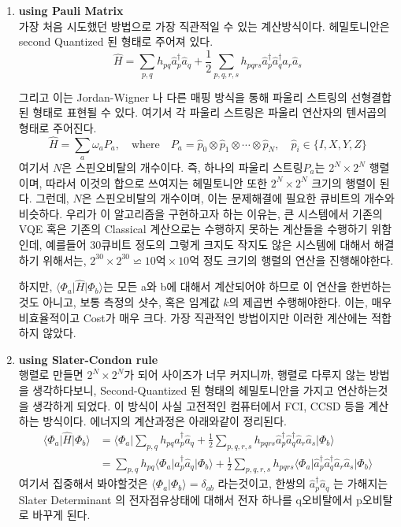 \documentclass[11pt]{article}
\begin{document}
\begin{enumerate}
  \item \textbf{using Pauli Matrix}\\ 
  가장 처음 시도했던 방법으로 가장 직관적일 수 있는 계산방식이다. 헤밀토니안은 second Quantized 된 형태로 주어져 있다. 
  \[
  \hat{H} = \sum_{p,q} h_{pq} \hat{a}_p^\dagger \hat{a}_q
  + \frac{1}{2} \sum_{p,q,r,s} h_{pqrs} \hat{a}_p^\dagger \hat{a}_q^\dagger \hat{a}_r \hat{a}_s
  \]

  그리고 이는 Jordan-Wigner 나 다른 매핑 방식을 통해 파울리 스트링의 선형결합된 형태로 표현될 수 있다. 
  여기서 각 파울리 스트링은 파울리 연산자의 텐서곱의 형태로 주어진다. 
  \[
  \hat{H} = \sum_{a} \omega_a P_a, \quad \text{where} \quad
  P_a = \hat{p}_0 \otimes \hat{p}_1 \otimes \cdots \otimes \hat{p}_N, \quad
  \hat{p}_i \in \{I, X, Y, Z\}
  \]
  여기서 \(N\)은 스핀오비탈의 개수이다. 즉, 하나의 파울리 스트링\(P_a\)는 \(2^N \times 2^N \) 행렬이며, 따라서 이것의 합으로 쓰여지는 헤밀토니안 또한 \(2^N \times 2^N \) 크기의 행렬이 된다.
  그런데, \(N\)은 스핀오비탈의 개수이며, 이는 문제해결에 필요한 큐비트의 개수와 비슷하다. 우리가 이 알고리즘을 구현하고자 하는 이유는, 큰 시스템에서 기존의 VQE 혹은 기존의 Classical 계산으로는 수행하지 못하는 계산들을 수행하기 위함인데, 
  예를들어 30큐비트 정도의 그렇게 크지도 작지도 않은 시스템에 대해서 해결하기 위해서는, \(2^{30} \times 2^{30} \backsimeq 10억 \times 10억 \) 정도 크기의 행렬의 연산을 진행해야한다. 

  하지만, \(\langle \Phi_a \vert \hat{H} \vert \Phi_b \rangle\)는 모든 a와 b에 대해서 계산되어야 하므로 
  이 연산을 한번하는것도 아니고, 보통 측정의 샷수, 혹은 임계값 \(k\)의 제곱번 수행해야한다. 
  이는, 매우 비효율적이고 Cost가 매우 크다. 가장 직관적인 방법이지만 이러한 계산에는 적합하지 않았다. 

  \item  \textbf{using Slater-Condon rule}\\
  행렬로 만들면 \(2^N \times 2^N \)가 되어 사이즈가 너무 커지니까, 행렬로 다루지 않는 방법을 생각하다보니, Second-Quantized 된 형태의 헤밀토니안을 가지고 연산하는것을 생각하게 되었다. 
  이 방식이 사실 고전적인 컴퓨터에서 FCI, CCSD 등을 계산하는 방식이다. 에너지의 계산과정은 아래와같이 정리된다. 
  \begin{align*}
  \langle \Phi_a \vert \hat{H} \vert \Phi_b \rangle &= \langle \Phi_a \vert \sum_{p,q} h_{pq} \hat{a}_p^\dagger \hat{a}_q
  + \frac{1}{2} \sum_{p,q,r,s} h_{pqrs} \hat{a}_p^\dagger \hat{a}_q^\dagger \hat{a}_r \hat{a}_s \vert \Phi_b \rangle \\
  & = \sum_{p,q} h_{pq} \langle \Phi_a \vert \hat{a}_p^\dagger \hat{a}_q 
  \vert \Phi_b \rangle + \frac{1}{2} \sum_{p,q,r,s} h_{pqrs} \langle \Phi_a \vert \hat{a}_p^\dagger \hat{a}_q^\dagger \hat{a}_r \hat{a}_s \vert \Phi_b \rangle
  \end{align*}
  여기서 집중해서 봐야할것은 \(\langle \Phi_a \vert \Phi_b \rangle = \delta_{ab}\) 라는것이고, 한쌍의 \(\hat{a}_p^\dagger \hat{a}_q\) 는 가해지는 Slater Determinant 의 
  전자점유상태에 대해서 전자 하나를 q오비탈에서 p오비탈로 바꾸게 된다. 


\end{enumerate}
\end{document}
